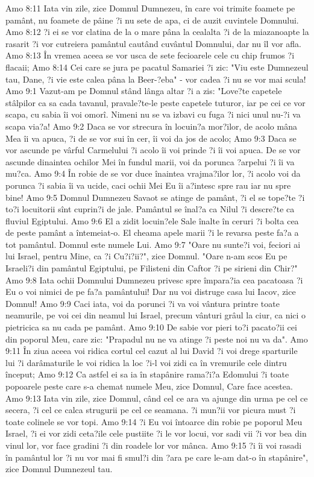 Amo 8:11  Iata vin zile, zice Domnul Dumnezeu, în care voi trimite foamete pe pamânt, nu foamete de pâine ?i nu sete de apa, ci de auzit cuvintele Domnului.
Amo 8:12  ?i ei se vor clatina de la o mare pâna la cealalta ?i de la miazanoapte la rasarit ?i vor cutreiera pamântul cautând cuvântul Domnului, dar nu îl vor afla.
Amo 8:13  În vremea aceea se vor usca de sete fecioarele cele cu chip frumos ?i flacaii;
Amo 8:14  Cei care se jura pe pacatul Samariei ?i zic: "Viu este Dumnezeul tau, Dane, ?i vie este calea pâna la Beer-?eba" - vor cadea ?i nu se vor mai scula!
Amo 9:1  Vazut-am pe Domnul stând lânga altar ?i a zis: "Love?te capetele stâlpilor ca sa cada tavanul, pravale?te-le peste capetele tuturor, iar pe cei ce vor scapa, cu sabia îi voi omorî. Nimeni nu se va izbavi cu fuga ?i nici unul nu-?i va scapa via?a!
Amo 9:2  Daca se vor strecura în locuin?a mor?ilor, de acolo mâna Mea îi va apuca, ?i de se vor sui în cer, îi voi da jos de acolo;
Amo 9:3  Daca se vor ascunde pe vârful Carmelului ?i acolo îi voi prinde ?i îi voi apuca. De se vor ascunde dinaintea ochilor Mei în fundul marii, voi da porunca ?arpelui ?i îi va mu?ca.
Amo 9:4  În robie de se vor duce înaintea vrajma?ilor lor, ?i acolo voi da porunca ?i sabia îi va ucide, caci ochii Mei Eu îi a?intesc spre rau iar nu spre bine!
Amo 9:5  Domnul Dumnezeu Savaot se atinge de pamânt, ?i el se tope?te ?i to?i locuitorii sînt cuprin?i de jale. Pamântul se înal?a ca Nilul ?i descre?te ca fluviul Egiptului.
Amo 9:6  El a zidit locuin?ele Sale înalte în ceruri ?i bolta cea de peste pamânt a întemeiat-o. El cheama apele marii ?i le revarsa peste fa?a a tot pamântul. Domnul este numele Lui.
Amo 9:7  "Oare nu sunte?i voi, feciori ai lui Israel, pentru Mine, ca ?i Cu?i?ii?", zice Domnul. "Oare n-am scos Eu pe Israeli?i din pamântul Egiptului, pe Filisteni din Caftor ?i pe sirieni din Chir?"
Amo 9:8  Iata ochii Domnului Dumnezeu privesc spre împara?ia cea pacatoasa ?i Eu o voi nimici de pe fa?a pamântului! Dar nu voi distruge casa lui Iacov, zice Domnul!
Amo 9:9  Caci iata, voi da porunci ?i va voi vântura printre toate neamurile, pe voi cei din neamul lui Israel, precum vânturi grâul la ciur, ca nici o pietricica sa nu cada pe pamânt.
Amo 9:10  De sabie vor pieri to?i pacato?ii cei din poporul Meu, care zic: "Prapadul nu ne va atinge ?i peste noi nu va da".
Amo 9:11  În ziua aceea voi ridica cortul cel cazut al lui David ?i voi drege sparturile lui ?i darâmaturile le voi ridica la loc ?i-l voi zidi ca în vremurile cele dintru început;
Amo 9:12  Ca astfel ei sa ia în stapânire rama?i?a Edomului ?i toate popoarele peste care s-a chemat numele Meu, zice Domnul, Care face acestea.
Amo 9:13  Iata vin zile, zice Domnul, când cel ce ara va ajunge din urma pe cel ce secera, ?i cel ce calca strugurii pe cel ce seamana. ?i mun?ii vor picura must ?i toate colinele se vor topi.
Amo 9:14  ?i Eu voi întoarce din robie pe poporul Meu Israel, ?i ei vor zidi ceta?ile cele pustiite ?i le vor locui, vor sadi vii ?i vor bea din vinul lor, vor face gradini ?i din roadele lor vor mânca.
Amo 9:15  ?i îi voi rasadi în pamântul lor ?i nu vor mai fi smul?i din ?ara pe care le-am dat-o în stapânire", zice Domnul Dumnezeul tau.


